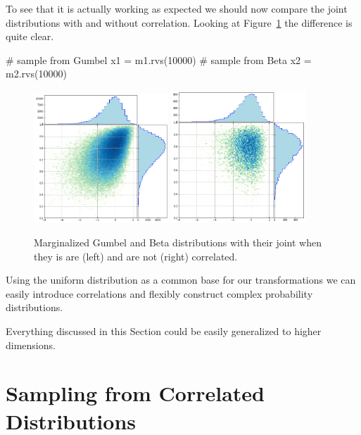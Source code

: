 To see that it is actually working as expected we should now compare the joint distributions with and without correlation. Looking at Figure~\ref{fig:gumbel_beta_with_corr} the difference is quite clear.

\begin{ipython}
# sample from Gumbel
x1 = m1.rvs(10000)
# sample from Beta
x2 = m2.rvs(10000)
\end{ipython}

\begin{figure}[htbp]
  \centering
  \includegraphics[width=0.45\textwidth]{figures/gumbel_vs_beta}
  \quad
  \includegraphics[width=0.45\textwidth]{figures/gumbel_vs_beta_corr}
  \caption{Marginalized Gumbel and Beta distributions with their joint when they is are (left) and are not (right) correlated.}
  \label{fig:gumbel_beta_with_corr}
\end{figure}
    
Using the uniform distribution as a common base for our transformations we can easily introduce correlations and flexibly construct complex probability distributions. 

Everything discussed in this Section could be easily generalized to higher dimensions.

\section{Sampling from Correlated Distributions}
\label{generate-correlated-distributions}

